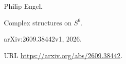 Philip Engel.

\newblock Complex structures on {$S^6$}.

\newblock arXiv:2609.38442v1, 2026.

\newblock URL \url{https://arxiv.org/abs/2609.38442}.
